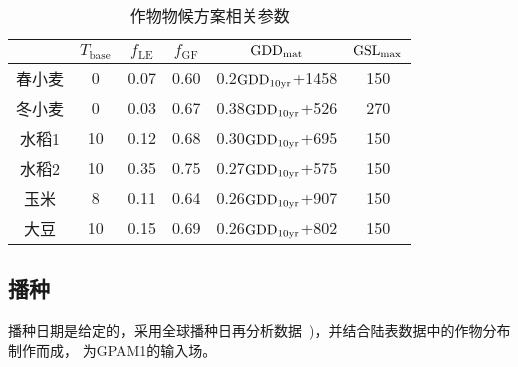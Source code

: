 \begin{table}[htbp]
  \centering
  \caption{作物物候方案相关参数}
  \label{tab:作物物候方案相关参数}
  \begin{tabular}{@{}cccccc@{}}
    \toprule
           & $T_{\mathrm{base}}$ & $f_{\mathrm{LE}}$ & $f_{\mathrm{GF}}$ & ${\rm GDD}_{\mathrm{mat}}$  & ${\rm GSL}_{\mathrm{max}}$ \\ \midrule
    春小麦 & 0                   & 0.07              & 0.60              & 0.2${\rm GDD}_{\rm 10yr}$+1458  & 150                  \\
    冬小麦 & 0                   & 0.03              & 0.67              & 0.38${\rm GDD}_{\rm 10yr}$+526  & 270                  \\
    水稻1  & 10                  & 0.12              & 0.68              & 0.30${\rm GDD}_{\rm 10yr}$+695  & 150                  \\
    水稻2  & 10                  & 0.35              & 0.75              & 0.27${\rm GDD}_{\rm 10yr}$+575  & 150                  \\
    玉米   & 8                   & 0.11              & 0.64              & 0.26${\rm GDD}_{\rm 10yr}$+907 & 150                  \\
    大豆   & 10                  & 0.15              & 0.69              & 0.26${\rm GDD}_{\rm 10yr}$+802  & 150                  \\ \bottomrule
  \end{tabular}
\end{table}

\subsection{播种}\label{sec:播种}
  播种日期是给定的，采用全球播种日再分析数据~\citep{jagermeyr2021climate})，并结合陆表数据中的作物分布制作而成，%
  为GPAM1的输入场。


